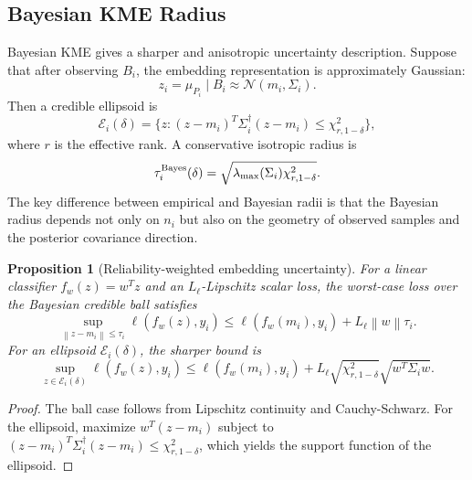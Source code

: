 \documentclass[10pt,journal]{IEEEtran}
\newtheorem{proposition}{Proposition}
\newcommand{\norm}[1]{\left\lVert #1 \right\rVert}
\begin{document}
\subsection{Bayesian KME Radius}

Bayesian KME gives a sharper and anisotropic uncertainty description. Suppose that after observing $B_i$, the embedding representation is approximately Gaussian:
\begin{equation}
    z_i=\mu_{P_i}\mid B_i\approx \mathcal{N}(m_i,\Sigma_i).
\end{equation}
Then a credible ellipsoid is
\begin{equation}
    \mathcal{E}_i(\delta)=\{z:(z-m_i)^T\Sigma_i^\dagger(z-m_i)\le \chi^2_{r,1-\delta}\},
\end{equation}
where $r$ is the effective rank. A conservative isotropic radius is
\begin{equation}
\label{eq:bayes-radius}
    \tau_i^{\rm Bayes}(\delta)=\sqrt{\lambda_{\max}(\Sigma_i)\chi^2_{r,1-\delta}}.
\end{equation}
The key difference between empirical and Bayesian radii is that the Bayesian radius depends not only on $n_i$ but also on the geometry of observed samples and the posterior covariance direction.

\begin{proposition}[Reliability-weighted embedding uncertainty]
\label{prop:bayes-radius}
For a linear classifier $f_w(z)=w^Tz$ and an $L_\ell$-Lipschitz scalar loss, the worst-case loss over the Bayesian credible ball satisfies
\begin{equation}
\label{eq:linear-robust}
    \sup_{\norm{z-m_i}\le \tau_i}\ell(f_w(z),y_i)
    \le \ell(f_w(m_i),y_i)+L_\ell\norm{w}\tau_i.
\end{equation}
For an ellipsoid $\mathcal{E}_i(\delta)$, the sharper bound is
\begin{equation}
    \sup_{z\in\mathcal{E}_i(\delta)}\ell(f_w(z),y_i)
    \le \ell(f_w(m_i),y_i)+L_\ell\sqrt{\chi^2_{r,1-\delta}}\sqrt{w^T\Sigma_i w}.
\end{equation}
\end{proposition}

\begin{proof}
The ball case follows from Lipschitz continuity and Cauchy-Schwarz. For the ellipsoid, maximize $w^T(z-m_i)$ subject to $(z-m_i)^T\Sigma_i^\dagger(z-m_i)\le \chi^2_{r,1-\delta}$, which yields the support function of the ellipsoid.
\end{proof}
\end{document}
